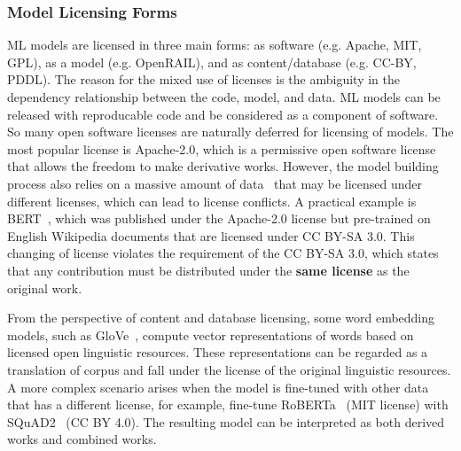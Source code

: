 \subsubsection{Model Licensing Forms}
ML models are licensed in three main forms: as software (e.g. Apache, MIT, GPL), as a model (e.g. OpenRAIL), and as content/database (e.g. CC-BY, PDDL).
The reason for the mixed use of licenses is the ambiguity in the dependency relationship between the code, model, and data.
ML models can be released with reproducable code and be considered as a component of software.
So many open software licenses are naturally deferred for licensing of models.
The most popular license is Apache-2.0, which is a permissive open software license that allows the freedom to make derivative works.
However, the model building process also relies on a massive amount of data~\cite{lecun2015deep} that may be licensed under different licenses, which can lead to license conflicts.
A practical example is BERT~\cite{devlin2018bert}, which was published under the Apache-2.0 license but pre-trained on English Wikipedia documents that are licensed under CC BY-SA 3.0.
This changing of license violates the requirement of the CC BY-SA 3.0, which states that any contribution must be distributed under the \textbf{same license} as the original work.


From the perspective of content and database licensing, some word embedding models, such as GloVe~\cite{pennington2014glove}, compute vector representations of words based on licensed open linguistic resources.
These representations can be regarded as a translation of corpus and fall under the license of the original linguistic resources.
A more complex scenario arises when the model is fine-tuned with other data that has a different license, for example, fine-tune RoBERTa~\cite{liu2019roberta} (MIT license) with SQuAD2~\cite{rajpurkar2016squad} (CC BY 4.0).
The resulting model can be interpreted as both derived works and combined works.

